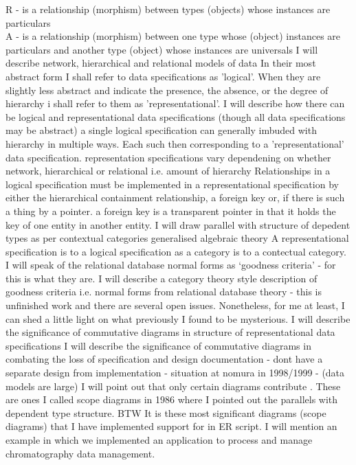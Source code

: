 \documentclass[10pt,a4paper]{article}
\theoremstyle{remark}
\begin{document}
\note
R - is a relationship (morphism) between types (objects) whose instances are particulars\\
A - is a relationship (morphism) between one type whose (object) instances are particulars and another type (object) whose instances are universals
\note
I will describe network, hierarchical and relational models of data
\note In their most abstract form I shall refer to data specifications as 'logical'.
\note When they are slightly less abstract and indicate the presence, the absence, or the degree of hierarchy i shall refer to them as 'representational'. 
\note
I will describe how there can be logical and representational data specifications
(though all data specifications may be abstract)
\note
a single logical specification can generally imbuded with hierarchy in  multiple ways. 
Each such then corresponding to a 'representational' data specification.
\note
representation specifications vary dependening on whether network, hierarchical or relational  i.e. amount of hierarchy
\note Relationships in a logical specification must be implemented in a representational specification by either 
the hierarchical containment relationship, a foreign key or, if there is such a thing by a pointer.  
\note a foreign key is a transparent pointer in that it holds the key of one entity in another entity.
\note
I will draw parallel with structure of depedent types as per contextual categories generalised algebraic theory
A representational specification is to a logical specification as a category is to a contectual category.
\note 
I will speak of the relational database normal forms as `goodness criteria' - for this is what they are.  
\note
I will describe a category theory style description of goodness criteria i.e. normal forms from relational database theory - this is unfinished work and there are several open issues.
\note Nonetheless, for me at least, I can shed a little light on what previously I found to be mysterious.
\note 
I will describe the significance of commutative diagrams in structure of representational data specifications 
\note
I will describe the significance of commutative diagrams in combating the loss of specification and design documentation - dont have a separate design from implementation - situation at nomura in 1998/1999 - (data models are large)
\note I will point out that only certain diagrams contribute . These are ones I called scope diagrams in 1986 where I pointed out
the parallels with dependent type structure.
\note 
BTW It is these most significant diagrams (scope diagrams) that I have implemented support for in ER script.
\note 
I will mention an example in which we implemented an application  to process and manage  chromatography data management.
\end{document}
